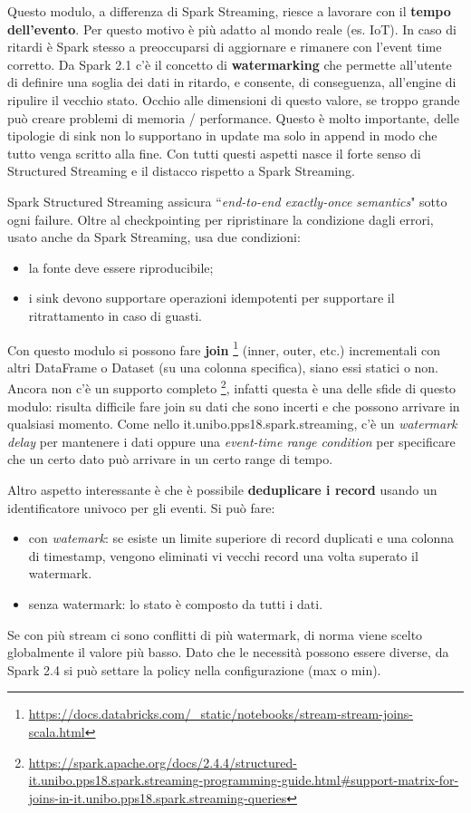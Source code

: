 \documentclass[12pt,italian]{article}
\begin{document}
\par Questo modulo, a differenza di Spark Streaming, riesce a lavorare con il \textbf{tempo dell'evento}. Per questo motivo è più adatto al mondo reale (es. IoT).
In caso di ritardi è Spark stesso a preoccuparsi di aggiornare e rimanere con l'event time corretto.
Da Spark 2.1 c'è il concetto di \textbf{watermarking} che permette all'utente di definire una soglia dei dati in ritardo, e consente, di conseguenza, all'engine di ripulire il vecchio stato.
Occhio alle dimensioni di questo valore, se troppo grande può creare problemi di memoria / performance. Questo è molto importante, delle tipologie di sink non lo supportano in update ma solo in append in modo  che tutto venga scritto alla fine.
\newline
Con tutti questi aspetti nasce il forte senso di Structured Streaming e il distacco rispetto a  Spark Streaming.
\par Spark Structured Streaming assicura ``\textit{end-to-end exactly-once semantics}" sotto ogni failure.
Oltre al checkpointing per ripristinare la condizione dagli errori, usato anche da Spark Streaming, usa due condizioni:
\begin{itemize}
	\item la fonte deve essere riproducibile;
	\item i sink devono supportare operazioni idempotenti per supportare il ritrattamento in caso di guasti.
\end{itemize}
\par Con questo modulo si possono fare \textbf{join} \footnote{\url{https://docs.databricks.com/_static/notebooks/stream-stream-joins-scala.html}} (inner, outer, etc.) incrementali con altri DataFrame o Dataset (su una colonna specifica), siano essi statici o non.
Ancora non c'è un supporto completo \footnote{\url{https://spark.apache.org/docs/2.4.4/structured-it.unibo.pps18.spark.streaming-programming-guide.html\#support-matrix-for-joins-in-it.unibo.pps18.spark.streaming-queries}}, infatti questa è una delle sfide di questo modulo: risulta difficile fare join su dati che sono incerti e che possono arrivare in qualsiasi momento. Come nello it.unibo.pps18.spark.streaming, c'è un \textit{watermark delay} per mantenere i dati oppure una \textit{event-time range condition} per specificare che un certo dato può arrivare in un certo range di tempo.

\par Altro aspetto interessante è che è possibile \textbf{deduplicare i record} usando un identificatore univoco per gli eventi. Si può fare:
\begin{itemize}
	\item con \textit{watemark}: se esiste un limite superiore di record duplicati e una colonna di timestamp, vengono eliminati vi vecchi record una volta superato il watermark.
	\item senza watermark: lo stato è composto da tutti i dati.
\end{itemize}
Se con più stream ci sono conflitti di più watermark, di norma viene scelto globalmente il valore più basso. Dato che le necessità possono essere diverse, da Spark 2.4 si può
settare la policy nella configurazione (max o min).
\end{document}
